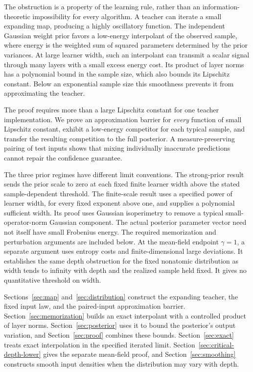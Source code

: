 \documentclass[11pt]{article}
\theoremstyle{remark}\newtheorem{remark}[theorem]{Remark}
\begin{document}
The obstruction is a property of the learning rule, rather than an
information-theoretic impossibility for every algorithm. A teacher can
iterate a small expanding map, producing a highly oscillatory function.
The independent Gaussian weight prior favors a low-energy
interpolant of the observed sample, where energy is the weighted sum of
squared parameters determined by the prior variances. At large learner
width, such an interpolant can transmit a scalar signal through many
layers with a small excess energy cost. Its product of layer norms has
a polynomial bound in the sample size, which also bounds its Lipschitz
constant. Below an exponential
sample size this smoothness prevents it from approximating the teacher.

The proof requires more than a large Lipschitz constant for one teacher
implementation. We prove an approximation barrier for \emph{every}
function of small Lipschitz constant, exhibit a low-energy competitor
for each typical sample, and transfer the resulting competition to the
full posterior. A measure-preserving pairing of test inputs shows that
mixing individually inaccurate predictions cannot repair the confidence
guarantee.

The three prior regimes have different limit conventions. The
strong-prior result sends the prior scale to zero at each fixed finite
learner width above the stated sample-dependent threshold. The
finite-scale result uses a specified power of learner width, for every
fixed exponent above one, and supplies a polynomial sufficient width.
Its proof uses Gaussian isoperimetry
to remove a typical small-operator-norm Gaussian component. The actual
posterior parameter vector need not itself have small Frobenius energy.
The required memorization and perturbation arguments are included below.
At the mean-field endpoint $\gamma=1$, a separate argument uses entropy costs and
finite-dimensional large deviations. It establishes the same depth
obstruction for the fixed nonatomic distribution as width tends to
infinity with depth and the realized sample held fixed. It gives no
quantitative threshold on width.

Sections~\ref{sec:map} and~\ref{sec:distribution} construct the expanding
teacher, the fixed input law, and the paired-input approximation barrier.
Section~\ref{sec:memorization} builds an exact interpolant with a controlled
product of layer norms. Section~\ref{sec:posterior} uses it to bound the
posterior's output variation, and Section~\ref{sec:proof} combines these
bounds. Section~\ref{sec:exact} treats exact interpolation in the specified
iterated limit. Section~\ref{sec:critical-depth-lower} gives the separate
mean-field proof, and Section~\ref{sec:smoothing} constructs smooth input
densities when the distribution may vary with depth.
\end{document}
